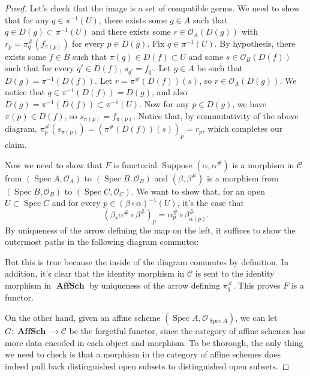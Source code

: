 \documentclass{article}
\newcommand{\calO}{\mathcal{O}}
\newcommand{\fC}{\mathscr{C}}
\newcommand{\fO}{\mathscr{O}}
\DeclareMathOperator{\AffSch}{\mathbf{AffSch}} %
\DeclareMathOperator{\Spec}{\mathrm{Spec}}
\theoremstyle{definition} %
\begin{document}
\begin{proof}
    Let's check that the image is a set of compatible germs. We need to show that for any $q\in \pi^{-1}(U)$, there exists some $g\in A$ such that $q\in D(g)\subset \pi^{-1}(U)$ and there exists some $r\in \calO_A(D(g))$ with $r_p=\pi_q^\# (f_{\pi(p)})$ for every $p\in D(g).$ Fix $q\in \pi^{-1}(U).$ By hypothesis, there exists some $f\in B$ such that $\pi(q)\in D(f) \subset U$ and some $s\in \calO_B(D(f))$ such that for every $q'\in D(f)$, $s_{q'}=f_{q'}.$ Let $g\in A$ be such that $D(g)=\pi^{-1}(D(f))$. Let $r=\pi^{\#}(D(f))(s)$, so $r\in \calO_A(D(g)).$ We notice that $q\in \pi^{-1}(D(f))=D(g)$, and also $D(g)=\pi^{-1}(D(f))\subset \pi^{-1}(U).$ Now for any $p\in D(g)$, we have $\pi(p)\in D(f)$, so $s_{\pi(p)}=f_{\pi(p)}$. Notice that, by commutativity of the above diagram, $\pi^\#_p(s_{\pi(p)})=(\pi^\#(D(f))(s))_p=r_p$, which completes our claim.

    Now we need to show that $F$ is functorial. Suppose $(\alpha, \alpha^\#)$ is a morphism in $\fC$ from $(\Spec A, \calO_A)$ to $(\Spec B, \calO_B)$ and $(\beta, \beta^\#)$ is a morphism from $(\Spec B, \calO_B)$ to $(\Spec C, \calO_C).$ We want to show that, for an open $U\subset \Spec C$ and for every $p\in (\beta \circ \alpha)^{-1}(U)$, it's the case that
    \[
    (\beta_* \alpha^\# \circ \beta^\#)_p = \alpha^\#_p \circ \beta^\#_{\alpha(p)}.
    \]
    By uniqueness of the arrow defining the map on the left, it suffices to show the outermost paths in the following diagram commutes:
    \begin{center}
    \end{center}
    But this is true because the inside of the diagram commutes by definition. In addition, it's clear that the identity morphism in $\fC$ is sent to the identity morphism in $\AffSch$ by uniqueness of the arrow defining $\pi_q^\#$. This proves $F$ is a functor.

    On the other hand, given an affine scheme $(\Spec A, \fO_{\Spec A})$, we can let $G:\AffSch\to \fC$ be the forgetful functor, since the category of affine schemes has more data encoded in each object and morphism. To be thorough, the only thing we need to check is that a morphism in the category of affine schemes does indeed pull back distinguished open subsets to distinguished open subsets.
\end{proof}
\end{document}
